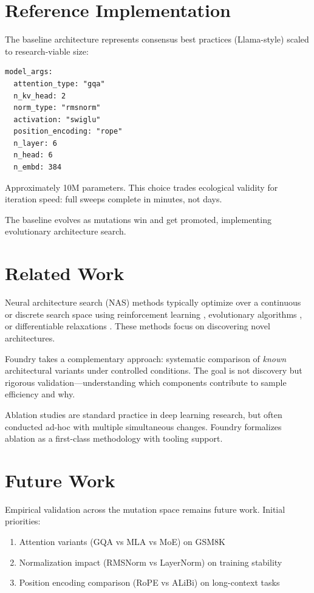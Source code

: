 \documentclass{article}
\begin{document}
\section{Reference Implementation}

The baseline architecture represents consensus best practices (Llama-style) scaled to research-viable size:

\begin{lstlisting}
model_args:
  attention_type: "gqa"
  n_kv_head: 2
  norm_type: "rmsnorm"
  activation: "swiglu"
  position_encoding: "rope"
  n_layer: 6
  n_head: 6
  n_embd: 384
\end{lstlisting}

Approximately 10M parameters. This choice trades ecological validity for iteration speed: full sweeps complete in minutes, not days.

The baseline evolves as mutations win and get promoted, implementing evolutionary architecture search.

\section{Related Work}

Neural architecture search (NAS) methods typically optimize over a continuous or discrete search space using reinforcement learning \cite{zoph2016neural}, evolutionary algorithms \cite{real2019regularized}, or differentiable relaxations \cite{liu2018darts}. These methods focus on discovering novel architectures.

Foundry takes a complementary approach: systematic comparison of \textit{known} architectural variants under controlled conditions. The goal is not discovery but rigorous validation---understanding which components contribute to sample efficiency and why.

Ablation studies are standard practice in deep learning research, but often conducted ad-hoc with multiple simultaneous changes. Foundry formalizes ablation as a first-class methodology with tooling support.

\section{Future Work}

Empirical validation across the mutation space remains future work. Initial priorities:

\begin{enumerate}
  \item Attention variants (GQA vs MLA vs MoE) on GSM8K
  \item Normalization impact (RMSNorm vs LayerNorm) on training stability
  \item Position encoding comparison (RoPE vs ALiBi) on long-context tasks
\end{enumerate}
\end{document}
